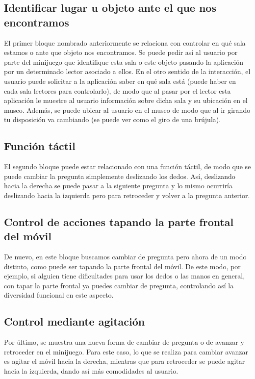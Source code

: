 \subsection*{Identificar lugar u objeto ante el que nos encontramos}

El primer bloque nombrado anteriormente se relaciona con controlar en qué sala estamos o ante que objeto nos encontramos. Se puede pedir así al usuario por parte del minijuego que identifique esta sala o este objeto pasando la aplicación por un determinado lector asociado a ellos. En el otro sentido de la interacción, el usuario puede solicitar a la aplicación saber en qué sala está (puede haber en cada sala lectores para controlarlo), de modo que al pasar por el  lector esta aplicación le muestre al usuario información sobre dicha sala y su ubicación en el museo. Además, se puede ubicar al usuario en el museo de modo que al ir girando tu disposición va cambiando (se puede ver como el giro de una brújula).

\subsection*{Función táctil}

El segundo bloque puede estar relacionado con una función táctil, de modo que se puede cambiar la pregunta simplemente deslizando los dedos. Así, deslizando hacia la derecha se puede pasar a la siguiente pregunta y lo mismo ocurriría deslizando hacia la izquierda pero para retroceder y volver a la pregunta anterior. 

\subsection*{Control de acciones tapando la parte frontal del móvil}

De nuevo, en este bloque buscamos cambiar de pregunta pero ahora de un modo distinto, como puede ser tapando la parte frontal del móvil. De este modo, por ejemplo, si alguien tiene dificultades para usar los dedos o las manos en general, con tapar la parte frontal ya puedes cambiar de pregunta, controlando así la diversidad funcional en este aspecto.

\subsection*{Control mediante agitación}

Por último, se muestra una nueva forma de cambiar de pregunta o de avanzar y retroceder en el minijuego. Para este caso, lo que se realiza para cambiar avanzar es agitar el móvil hacia la derecha, mientras que para retroceder se puede agitar hacia la izquierda, dando así más comodidades al usuario.


